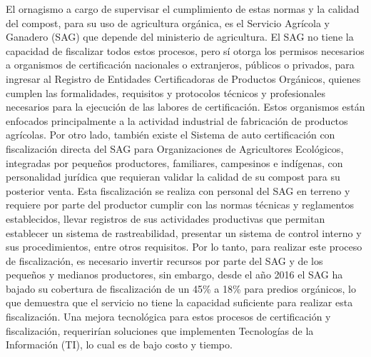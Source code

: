 \documentclass[12pt, letterpaper]{article}
\begin{document}
El ornagismo a cargo de supervisar el cumplimiento de estas normas y la calidad del compost, para su uso de agricultura orgánica, es el Servicio Agrícola y Ganadero (SAG) que depende del ministerio de agricultura. El SAG no tiene la capacidad de fiscalizar todos estos procesos, pero sí otorga los permisos necesarios a organismos de certificación nacionales o extranjeros, públicos o privados, para ingresar al Registro de Entidades Certificadoras de Productos Orgánicos, quienes cumplen las formalidades, requisitos y protocolos técnicos y profesionales necesarios para la ejecución de las labores de certificación. Estos organismos están enfocados principalmente a la actividad industrial de fabricación de productos agrícolas. Por otro lado, también existe el Sistema de auto certificación con fiscalización directa del SAG para Organizaciones de Agricultores Ecológicos, integradas por pequeños productores, familiares, campesinos e indígenas, con personalidad jurídica que requieran validar la calidad de su compost para su posterior venta. Esta fiscalización se realiza con personal del SAG en terreno y requiere por parte del productor cumplir con las normas técnicas y reglamentos establecidos, llevar registros de sus actividades productivas que permitan establecer un sistema de rastreabilidad, presentar un sistema de control interno y sus procedimientos, entre otros requisitos. Por lo tanto, para realizar este proceso de fiscalización, es necesario invertir recursos por parte del SAG y de los pequeños y medianos productores, sin embargo, desde el año 2016 el SAG ha bajado su cobertura de fiscalización de un 45\% a 18\% para predios orgánicos, lo que demuestra que el servicio no tiene la capacidad suficiente para realizar esta fiscalización. Una mejora tecnológica para estos procesos de certificación y fiscalización, requerirían soluciones que implementen Tecnologías de la Información (TI), lo cual es de bajo costo y tiempo.
\end{document}
